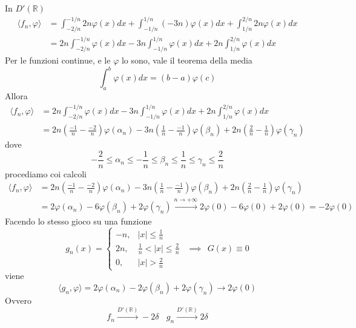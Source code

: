 In $D'(\mathbb{R})$
\begin{equation*}
\begin{aligned}
\langle f_{n} ,\varphi \rangle  & =\int ^{-1/n}_{-2/n} 2n\varphi ( x) dx+\int ^{1/n}_{-1/n}( -3n) \varphi ( x) dx+\int ^{2/n}_{1/n} 2n\varphi ( x) dx\\
 & =2n\int ^{-1/n}_{-2/n} \varphi ( x) dx-3n\int ^{1/n}_{-1/n} \varphi ( x) dx+2n\int ^{2/n}_{1/n} \varphi ( x) dx
\end{aligned}
\end{equation*}
Per le funzioni continue, e le $\varphi $ lo sono, vale il teorema della media
\begin{equation*}
\int ^{b}_{a} \varphi ( x) dx=( b-a) \varphi ( c)
\end{equation*}
Allora
\begin{equation*}
\begin{aligned}
\langle f_{n} ,\varphi \rangle  & =2n\int ^{-1/n}_{-2/n} \varphi ( x) dx-3n\int ^{1/n}_{-1/n} \varphi ( x) dx+2n\int ^{2/n}_{1/n} \varphi ( x) dx\\
 & =2n\left(\frac{-1}{n} -\frac{-2}{n}\right) \varphi ( \alpha _{n}) -3n\left(\frac{1}{n} -\frac{-1}{n}\right) \varphi ( \beta _{n}) +2n\left(\frac{2}{n} -\frac{1}{n}\right) \varphi ( \gamma _{n})
\end{aligned}
\end{equation*}
dove
\begin{equation*}
-\frac{2}{n} \leqslant \alpha _{n} \leqslant -\frac{1}{n} \leqslant \beta _{n} \leqslant \frac{1}{n} \leqslant \gamma _{n} \leqslant \frac{2}{n}
\end{equation*}
procediamo coi calcoli
\begin{equation*}
\begin{aligned}
\langle f_{n} ,\varphi \rangle  & =2n\left(\frac{-1}{n} -\frac{-2}{n}\right) \varphi ( \alpha _{n}) -3n\left(\frac{1}{n} -\frac{-1}{n}\right) \varphi ( \beta _{n}) +2n\left(\frac{2}{n} -\frac{1}{n}\right) \varphi ( \gamma _{n})\\
 & =2\varphi ( \alpha _{n}) -6\varphi ( \beta _{n}) +2\varphi ( \gamma _{n})\xrightarrow{n\rightarrow +\infty } 2\varphi ( 0) -6\varphi ( 0) +2\varphi ( 0) =-2\varphi ( 0)
\end{aligned}
\end{equation*}
Facendo lo stesso gioco su una funzione
\begin{equation*}
g_{n} (x)=\begin{cases}
-n, & |x|\leq \frac{1}{n}\\
2n, & \frac{1}{n} < |x|\leq \frac{2}{n}\\
0, & |x| >\frac{2}{n}
\end{cases} \ \ \implies \ \ G( x) \equiv 0
\end{equation*}
viene
\begin{equation*}
\langle g_{n} ,\varphi \rangle =2\varphi ( \alpha _{n}) -2\varphi ( \beta _{n}) +2\varphi ( \gamma _{n})\rightarrow 2\varphi ( 0)
\end{equation*}
Ovvero
\begin{equation*}
f_{n}\xrightarrow{D'(\mathbb{R})} -2\delta \ \ \ \ g_{n}\xrightarrow{D'(\mathbb{R})} 2\delta 
\end{equation*}
\Soluzione

